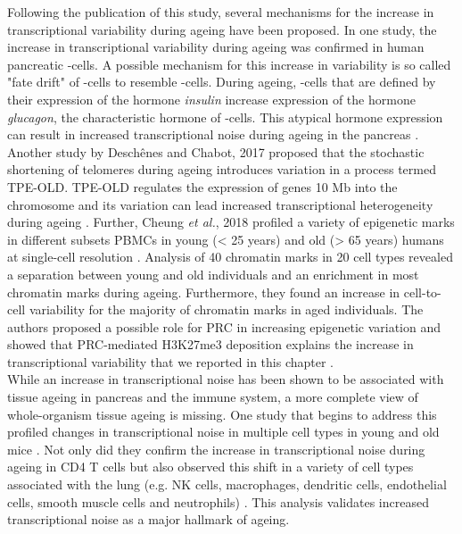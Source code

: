 Following the publication of this study, several mechanisms for the increase in transcriptional variability during ageing have been proposed. In one study, the increase in transcriptional variability during ageing was confirmed in human pancreatic \textbeta{}-cells. A possible mechanism for this increase in variability is so called "fate drift" of \textbeta{}-cells to resemble \textalpha{}-cells. During ageing, \textbeta{}-cells that are defined by their expression of the hormone \emph{insulin} increase expression of the hormone \emph{glucagon}, the characteristic hormone of \textalpha{}-cells. This atypical hormone expression can result in increased transcriptional noise during ageing in the pancreas \citep{Enge2017}. Another study by Desch\^{e}nes and Chabot, 2017 proposed that the stochastic shortening of telomeres during ageing introduces variation in a process termed \gls{TPE-OLD}. TPE-OLD regulates the expression of genes 10 Mb into the chromosome and its variation can lead increased transcriptional heterogeneity during ageing \cite{Deschenes2017}. Further, Cheung \emph{et al.}, 2018 profiled a variety of epigenetic marks in different subsets \glspl{PBMC} in young (< 25 years) and old (> 65 years) humans at single-cell resolution \citep{Cheung2018}. Analysis of 40 chromatin marks in 20 cell types revealed a separation between young and old individuals and an enrichment in most chromatin marks during ageing. Furthermore, they found an increase in cell-to-cell variability for the majority of chromatin marks in aged individuals. The authors proposed a possible role for \gls{PRC} in increasing epigenetic variation and showed that PRC-mediated H3K27me3 deposition explains the increase in transcriptional variability that we reported in this chapter \citep{Cheung2018}.\\

While an increase in transcriptional noise has been shown to be associated with tissue ageing in pancreas and the immune system, a more complete view of whole-organism tissue ageing is missing. One study that begins to address this profiled changes in transcriptional noise in multiple cell types in young and old mice \citep{Angelidis2018}. Not only did they confirm the increase in transcriptional noise during ageing in CD4\plus{} T cells but also observed this shift in a variety of cell types associated with the lung (e.g. NK cells, macrophages, dendritic cells, endothelial cells, smooth muscle cells and neutrophils) \citep{Angelidis2018}. This analysis validates increased transcriptional noise as a major hallmark of ageing. \\

